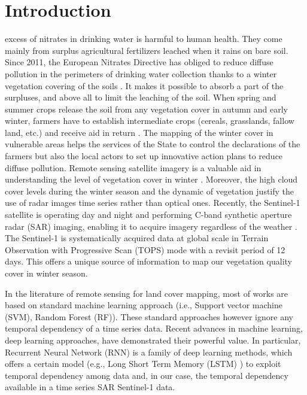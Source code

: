 \documentclass[journal, onecolumn]{IEEEtran}
\begin{document}
\section{Introduction\label{sec:Introduction}}

 excess of nitrates in drinking water is harmful to human health. They come mainly from surplus agricultural fertilizers leached when it rains on bare soil. Since 2011, the European Nitrates Directive has obliged to reduce diffuse pollution in the perimeters of drinking water collection thanks to a winter vegetation covering of the soils  \cite{Kallis01}. It makes it possible to absorb a part of the surpluses, and above all to limit the leaching of the soil. When spring and summer crops release the soil from any vegetation cover in autumn and early winter, farmers have to establish intermediate crops (cereals, grasslands, fallow land, etc.) and receive aid in return \cite{Buckley13}. The mapping of the winter cover in vulnerable areas helps the services of the State to control the declarations of the farmers but also the local actors to set up innovative action plans to reduce diffuse pollution. Remote sensing satellite imagery is a valuable aid in understanding the level of vegetation cover in winter \cite{Hively09}. Moreover, the high cloud cover levels during the winter season and the dynamic of vegetation justify the use of radar images time series rather than optical ones. Recently,  the Sentinel-1 satellite is operating day and night and performing C-band synthetic aperture radar (SAR) imaging, enabling it to acquire imagery regardless of the weather \cite{TORRES20129}. The Sentinel-1 is systematically acquired data at global scale  in Terrain Observation with Progressive Scan (TOPS) mode with a revisit period of 12 days. This offers a unique source of information to map our vegetation quality cover in winter season.   

In the literature of remote sensing for land cover mapping, most of works are based on standard machine learning approach (i.e., Support vector machine (SVM), Random Forest (RF)). These standard approaches however ignore any temporal dependency of a time series data. Recent advances in machine learning, deep learning approaches, have demonstrated their powerful value. In particular, Recurrent Neural Network (RNN) \cite{BengioCV13} is a family of deep learning methods, which offers a certain model (e.g., Long Short Term Memory (LSTM) \cite{HochreiterS96}) to exploit temporal dependency among data and, in our case, the temporal dependency available in a time series SAR Sentinel-1 data.  
\end{document}
